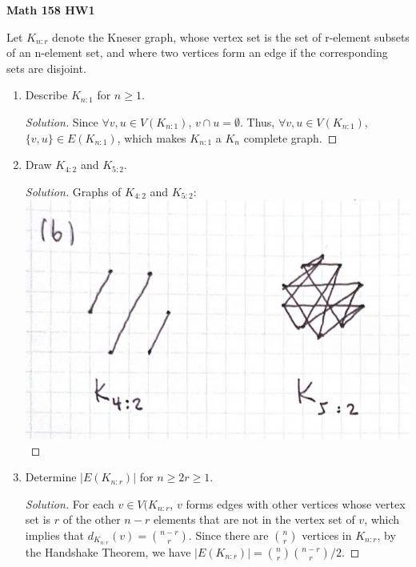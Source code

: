 \documentclass{article}
\newenvironment{problem}[2][Question]{\begin{trivlist}
\item[\hskip \labelsep {\bfseries #1}\hskip \labelsep {\bfseries #2.}]}{\end{trivlist}}
\begin{document}
 

\textbf{Math 158 HW1}

\begin{problem}{1}
    Let $K_{n:r}$ denote the Kneser graph, whose vertex set is the set of
    r-element subsets of an n-element set, and where two vertices form an edge if the
    corresponding sets are disjoint.
    \begin{enumerate}[label=(\alph*)]
    \item Describe $K_{n:1}$ for $n \geq 1$.
    \begin{proof}[Solution]
        Since $\forall v,u \in V(K_{n:1})$, $v \cap u = \emptyset$. Thus, $\forall v,u \in V(K_{n:1})$, $\{v, u\} \in E(K_{n:1})$, which makes $K_{n:1}$ a $K_n$ complete graph.
    \end{proof}
    
    \item Draw $K_{4:2}$ and $K_{5:2}$.
    \begin{proof}[Solution]
        Graphs of $K_{4:2}$ and $K_{5:2}$: \\
        \includegraphics[width=\textwidth]{Q172b}
    \end{proof}

    \item Determine $|E({K_{n:r}})|$ for $n \geq 2r \geq 1$.
    
    \begin{proof}[Solution]
        For each $v \in V(K_{n:r}$, $v$ forms edges with other vertices whose vertex set is $r$ of the other $n-r$ elements that are not in the vertex set of $v$, which implies that $d_{K_{n:r}}(v) = {{n-r} \choose {r}}$. Since there are $n \choose r$ vertices in $K_{n:r}$, by the Handshake Theorem, we have  $|E(K_{n:r})| = \binom{n}{r}\binom{n-r}{r}/2$.
    \end{proof}
\end{enumerate}
\end{problem}
\end{document}
